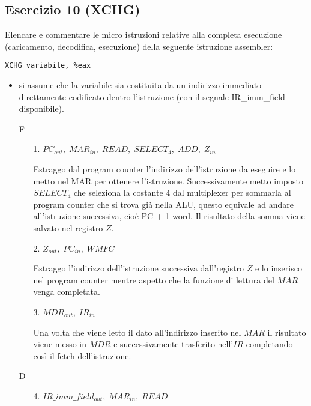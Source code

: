 \documentclass[a4paper]{article}
\theoremstyle{break}
\theoremstyle{break}
\theoremstyle{break}
\theoremstyle{break}
\begin{document}
\subsection{Esercizio 10 (XCHG)}
\begin{exercise}
  Elencare e commentare le micro istruzioni relative alla completa esecuzione (caricamento, decodifica, esecuzione) della seguente istruzione assembler: 

  \begin{center}
    \texttt{XCHG variabile, \%eax}
  \end{center}

  \begin{itemize}
    \item 
      si assume che la variabile sia costituita da un indirizzo immediato direttamente
      codificato dentro l'istruzione (con il segnale IR\_imm\_field disponibile).
  \end{itemize}

  \begin{enumerate}
    \item [F]
      \begin{enumerate}
        \item[1.] \( PC_{out},\; MAR_{in},\; READ,\; SELECT_4,\; ADD,\; Z_{in} \) 

          \noindent Estraggo dal program counter l'indirizzo dell'istruzione da eseguire e
          lo metto nel MAR per ottenere l'istruzione. Successivamente metto imposto
          \( SELECT_4 \) che seleziona la costante \( 4 \) dal multiplexer per sommarla
          al program counter che si trova già nella ALU, questo equivale ad andare 
          all'istruzione successiva, cioè PC + 1 word. Il risultato della somma
          viene salvato nel registro \( Z \).

        \item[2.] \( Z_{out},\; PC_{in},\; WMFC \) 

          \noindent Estraggo l'indirizzo dell'istruzione successiva dall'registro \( Z \) 
          e lo inserisco nel program counter mentre aspetto che la funzione di lettura
          del \( MAR \) venga completata.

        \item[3.] \( MDR_{out},\; IR_{in} \) 

          \noindent Una volta che viene letto il dato all'indirizzo inserito nel \( MAR \)
          il risultato viene messo in \( MDR \) e successivamente trasferito nell'\( IR \)
          completando così il fetch dell'istruzione.
      \end{enumerate}
    \item [D]
      \begin{enumerate}
        \item [4.] \( IR\_imm\_field_{out},\; MAR_{in},\; READ \) 


\end{enumerate}
\end{enumerate}
\end{exercise}
\end{document}

